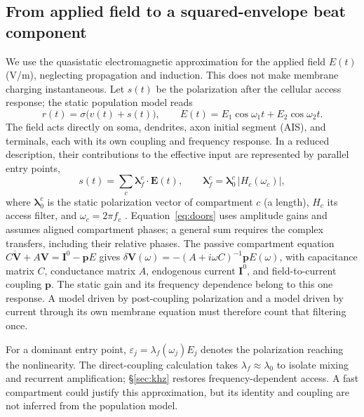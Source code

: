 \documentclass[11pt,a4paper]{article}
\newcommand{\Sig}{\sigma}
\begin{document}
\subsection{From applied field to a squared-envelope beat component}\label{sec:coupling}
We use the quasistatic electromagnetic approximation for the applied field $E(t)$
(V/m), neglecting propagation and induction. This does not make membrane charging
instantaneous. Let $s(t)$ be the polarization after the cellular access response;
the static population model reads
\begin{equation}
r(t)=\Sig\!\big(v(t)+s(t)\big),\qquad
E(t)=E_1\cos\omega_1 t+E_2\cos\omega_2 t .
\label{eq:coupling}
\end{equation}
The field acts directly on soma, dendrites, axon initial segment (AIS), and terminals,
each with its own coupling and frequency response. In a reduced description, their
contributions to the effective input are represented by parallel entry points,
\begin{equation}
s(t)=\sum_c \boldsymbol\lambda^c_f\!\cdot\!\mathbf E(t),\qquad
\boldsymbol\lambda^c_f=\boldsymbol\lambda^c_0\,\lvert H_c(\omega_c)\rvert,
\label{eq:doors}
\end{equation}
where $\boldsymbol\lambda^c_0$ is the static polarization vector of compartment $c$ (a length),
$H_c$ its access filter, and $\omega_c=2\pi f_c$
\cite{ruffini2025rosetta,galangadea2023}. Equation~\eqref{eq:doors} uses amplitude
gains and assumes aligned compartment phases; a general sum requires the complex
transfers, including their relative phases. The passive
compartment equation $C\dot{\mathbf V}+A\mathbf V=\mathbf I^0-\mathbf pE$
\cite{ruffini2021nmm2} gives
$\delta\mathbf V(\omega)=-(A+i\omega C)^{-1}\mathbf pE(\omega)$, with capacitance
matrix $C$, conductance matrix $A$, endogenous current $\mathbf I^0$, and field-to-current
coupling $\mathbf p$. The static gain and its frequency dependence belong to this
one response. A model driven by post-coupling polarization and a model driven by
current through its own membrane equation must therefore count that filtering once.

For a dominant entry point, $\varepsilon_j=\lambda_f(\omega_j)E_j$ denotes the
polarization reaching the nonlinearity. The direct-coupling calculation takes
$\lambda_f\approx\lambda_0$ to isolate mixing and recurrent amplification;
\S\ref{sec:khz} restores frequency-dependent access. A fast compartment could
justify this approximation, but its identity and coupling are not inferred from
the population model.
\end{document}

